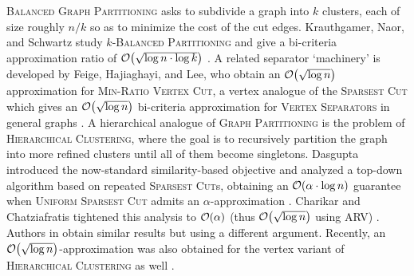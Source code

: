 \textsc{Balanced Graph Partitioning} asks to subdivide a graph into $k$ clusters, each of size roughly $n/k$ so as to minimize the cost of the cut edges. Krauthgamer, Naor, and Schwartz study \textsc{$k$-Balanced Partitioning} and give a bi-criteria approximation ratio of $\mathcal{O}\mathopen{}\left( \sqrt{\log n\cdot \log k} \right)$ \cite{PartitioningGraphsIntoBalancedComponents}. A related separator `machinery' is developed by Feige, Hajiaghayi, and Lee, who obtain an $\mathcal{O}\mathopen{}\left( \sqrt{\log n} \right)$ approximation for \textsc{Min-Ratio Vertex Cut}, a vertex analogue of the \textsc{Sparsest Cut} which gives an $\mathcal{O}\mathopen{}\left( \sqrt{\log n} \right)$ bi-criteria approximation for \textsc{Vertex Separators} in general graphs \cite{ImprovedApproximationAlgorithmsForMinimumWeightVertexSeparators}. 
A hierarchical analogue of \textsc{Graph Partitioning} is the problem of \textsc{Hierarchical Clustering}, where the goal is to recursively partition the graph into more refined clusters until all of them become singletons.
Dasgupta introduced the now-standard similarity-based objective and analyzed a top-down algorithm based on repeated \textsc{Sparsest Cut}s, obtaining an $\mathcal{O}\mathopen{}\left( \alpha\cdot\log n \right)$ guarantee when \textsc{Uniform Sparsest Cut} admits an $\alpha$-approximation \cite{ACostFunctionForSimilarityBasedHierarchicalClustering}. Charikar and Chatziafratis tightened this analysis to $\mathcal{O}\mathopen{}\left( \alpha \right)$ (thus $\mathcal{O}\mathopen{}\left( \sqrt{\log n} \right)$ using ARV) \cite{ApproximateHierarchicalClusteringViaSparsestCutAndSpreadingMetrics}. Authors in \cite{HierarchicalClusteringObjectiveFunctionsAndAlgorithms} obtain similar results but using a different argument. Recently, an $\mathcal{O}\mathopen{}\left( \sqrt{\log n} \right)$-approximation was also obtained for the vertex variant of \textsc{Hierarchical Clustering} as well \cite{ApproximatingTheAverageCaseGraphSearchProblemWithNonUniformCosts}.

